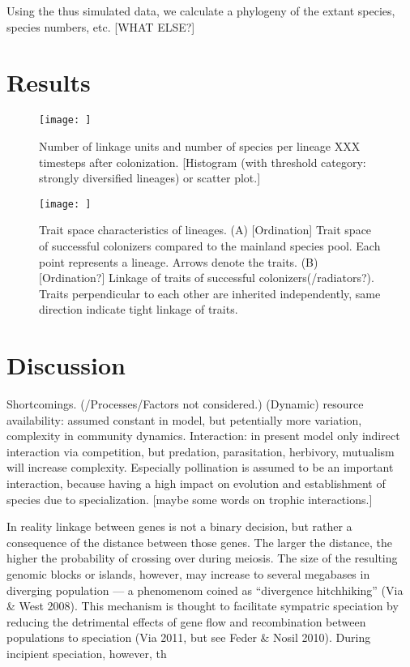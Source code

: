 \documentclass[a4paper]{scrartcl}
\begin{document}
Using the thus simulated data, we calculate a phylogeny of the extant species, species numbers, etc. [WHAT ELSE?]

\section{Results}

\begin{figure}
  \texttt{[image: ]}
  \caption{Number of linkage units and number of species per lineage XXX timesteps after colonization.
    [Histogram (with threshold category: strongly diversified lineages) or scatter plot.]}
  \label{specieslinkage}
\end{figure}

\begin{figure}
  \texttt{[image: ]}
  \caption{Trait space characteristics of lineages.
    (A) [Ordination] Trait space of successful colonizers compared to the mainland species pool. Each point represents a lineage.
    Arrows denote the traits.
    (B) [Ordination?] Linkage of traits of successful colonizers(/radiators?). Traits perpendicular to each other are inherited independently,
  same direction indicate tight linkage of traits.}
  \label{traitspace}
\end{figure}


\section{Discussion}
Shortcomings. (/Processes/Factors not considered.)
(Dynamic) resource availability: assumed constant in model, but petentially more variation, complexity in community dynamics.
Interaction: in present model only indirect interaction via competition, but predation, parasitation, herbivory, mutualism will increase complexity.
Especially pollination is assumed to be an important interaction, because having a high impact on evolution and establishment of species due to specialization.
[maybe some words on trophic interactions.]

In reality linkage between genes is not a binary decision, but rather a consequence of the distance between those genes.
The larger the distance, the higher the probability of crossing over during meiosis.
The size of the resulting genomic blocks or islands, however, may increase to several megabases in diverging population ---
a phenomenom coined as ``divergence hitchhiking'' (Via \& West 2008). %
This mechanism is thought to facilitate sympatric speciation by reducing the detrimental effects of gene flow and
recombination between populations to speciation (Via 2011, but see Feder \& Nosil 2010).
During incipient speciation, however, th


\printbibliography
\end{document}
